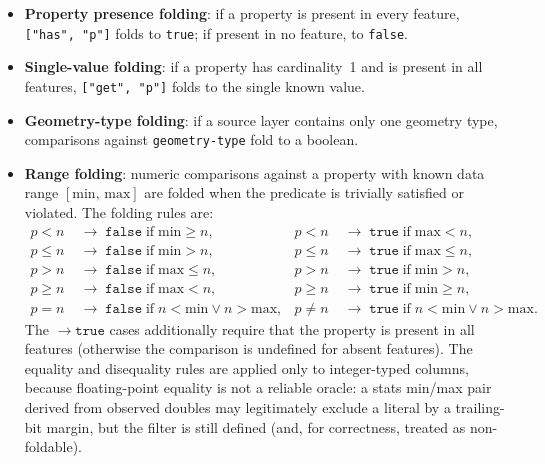 \begin{itemize}
    \item \textbf{Property presence folding}: if a property is present in every feature, \texttt{["has",~"p"]} folds to \texttt{true}; if present in no feature, to \texttt{false}.
    \item \textbf{Single-value folding}: if a property has cardinality~1 and is present in all features, \texttt{["get",~"p"]} folds to the single known value.
    \item \textbf{Geometry-type folding}: if a source layer contains only one geometry type, comparisons against \texttt{geometry-type} fold to a boolean.
    \item \textbf{Range folding}: numeric comparisons against a property with known data range $[\mathrm{min},\, \mathrm{max}]$ are folded when the predicate is trivially satisfied or violated.
    The folding rules are:
    \begin{equation}\label{eq:range_folding}
    \begin{aligned}
        p < n  &\;\to\; \mathtt{false} \;\text{if}\; \mathrm{min} \geq n, &
        p < n  &\;\to\; \mathtt{true}  \;\text{if}\; \mathrm{max} < n, \\
        p \leq n &\;\to\; \mathtt{false} \;\text{if}\; \mathrm{min} > n, &
        p \leq n &\;\to\; \mathtt{true}  \;\text{if}\; \mathrm{max} \leq n, \\
        p > n  &\;\to\; \mathtt{false} \;\text{if}\; \mathrm{max} \leq n, &
        p > n  &\;\to\; \mathtt{true}  \;\text{if}\; \mathrm{min} > n, \\
        p \geq n &\;\to\; \mathtt{false} \;\text{if}\; \mathrm{max} < n, &
        p \geq n &\;\to\; \mathtt{true}  \;\text{if}\; \mathrm{min} \geq n, \\
        p = n  &\;\to\; \mathtt{false} \;\text{if}\; n < \mathrm{min} \lor n > \mathrm{max}, &
        p \neq n &\;\to\; \mathtt{true}  \;\text{if}\; n < \mathrm{min} \lor n > \mathrm{max}.
    \end{aligned}
    \end{equation}
    The $\to \mathtt{true}$ cases additionally require that the property is present in all features (otherwise the comparison is undefined for absent features).
    The equality and disequality rules are applied only to integer-typed columns, because floating-point equality is not a reliable oracle: a stats min/max pair derived from observed doubles may legitimately exclude a literal by a trailing-bit margin, but the filter is still defined (and, for correctness, treated as non-foldable).

\end{itemize}
